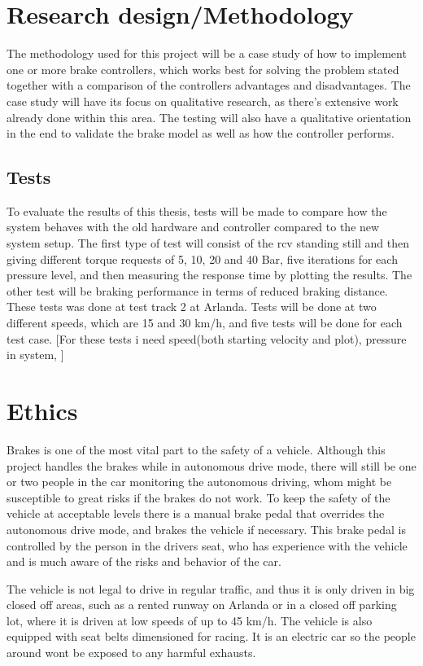 \documentclass[a4paper,11pt]{kth-mag}
\begin{document}
 
\section{Research design/Methodology}
The methodology used for this project will be a case study of how to implement one or more brake controllers, which works best for solving the problem stated together with a comparison of the controllers advantages and disadvantages. The case study will have its focus on qualitative research, as there's extensive work already done within this area. The testing will also have a qualitative orientation in the end to validate the brake model as well as how the controller performs. 

\subsection{Tests}
To evaluate the results of this thesis, tests will be made to compare how the system behaves with the old hardware and controller compared to the new system setup. The first type of test will consist of the \gls{rcv} standing still and then giving different torque requests of 5, 10, 20 and 40 Bar, five iterations for each pressure level, and then measuring the response time by plotting the results. 
The other test will be braking performance in terms of reduced braking distance. These tests was done at test track 2 at Arlanda. Tests will be done at two different speeds, which are 15 and 30 km/h, and five tests will be done for each test case. [For these tests i need speed(both starting velocity and plot), pressure in system, ]


\section{Ethics}
Brakes is one of the most vital part to the safety of a vehicle. Although this project handles the brakes while in autonomous drive mode, there will still be one or two people in the car monitoring the autonomous driving, whom might be susceptible to great risks if the brakes do not work. To keep the safety of the vehicle at acceptable levels there is a manual brake pedal that overrides the autonomous drive mode, and brakes the vehicle if necessary. This brake pedal is controlled by the person in the drivers seat, who has experience with the vehicle and is much aware of the risks and behavior of the car. 

The vehicle is not legal to drive in regular traffic, and thus it is only driven in big closed off areas, such as a rented runway on Arlanda or in a closed off parking lot, where it is driven at low speeds of up to 45 km/h. The vehicle is also equipped with seat belts dimensioned for racing. 
It is an electric car so the people around wont be exposed to any harmful exhausts. 
\end{document}
